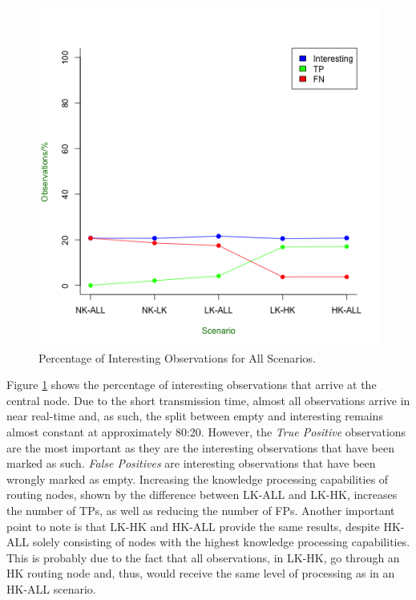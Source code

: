 \begin{figure}[h]
	\centering
	\includegraphics[width=\textwidth]{Chap7/figures/ideal_int_percent}
	\caption{Percentage of Interesting Observations for All Scenarios.}
	\label{fig:res:ideal:int}
\end{figure}

Figure \ref{fig:res:ideal:int} shows the percentage of interesting observations that arrive at the central node. Due to the short transmission time, almost all observations arrive in near real-time and, as such, the split between empty and interesting remains almost constant at approximately 80:20. However, the \textit{True Positive} observations are the most important as they are the interesting observations that have been marked as such. \textit{False Positives} are interesting observations that have been wrongly marked as empty. Increasing the knowledge processing capabilities of routing nodes, shown by the difference between LK-ALL and LK-HK, increases the number of TPs, as well as reducing the number of FPs. Another important point to note is that LK-HK and HK-ALL provide the same results, despite HK-ALL solely consisting of nodes with the highest knowledge processing capabilities.  This is probably due to the fact that all observations, in LK-HK, go through an HK routing node and, thus, would receive the same level of processing as in an HK-ALL scenario.

